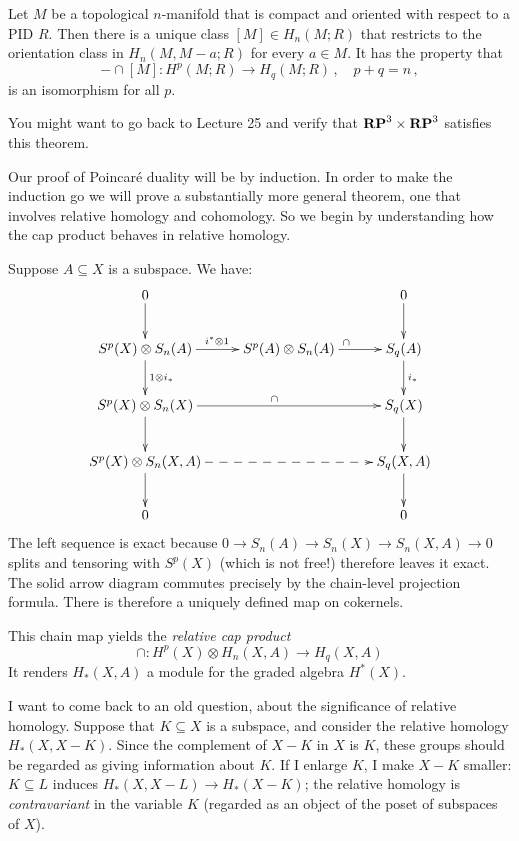 \begin{theorem}
Let $M$ be a topological $n$-manifold that is compact and oriented with 
respect to a PID $R$. Then there is a unique class $[M]\in H_n(M;R)$ that
restricts to the orientation class in $H_n(M,M-a;R)$ for every $a\in M$. 
It has the property that
\[
-\cap[M]:H^p(M;R)\to H_q(M;R)\,,\quad p+q=n\,,
\]
is an isomorphism for all $p$.
\end{theorem}

You might want to go back to Lecture 25 and verify that $\mathbf{RP}^3\times\mathbf{RP}^3$
satisfies this theorem. 

Our proof of Poincar\'e duality will be by induction. In order to make the
induction go we will prove a substantially more general theorem, one that
involves relative homology and cohomology. So we begin by understanding
how the cap product behaves in relative homology.

Suppose $A\subseteq X$ is a subspace. We have:
\begin{equation*}
\xymatrix{
	0\ar[d] & & 0\ar[d]\\
	S^p(X)\otimes S_n(A)\ar[d]^{1\otimes i_\ast}\ar[r]^{i^\ast\otimes 1} & S^p(A)\otimes S_n(A)\ar[r]^{\cap} & S_q(A)\ar[d]^{i_*}\\
	S^p(X)\otimes S_n(X)\ar[rr]^\cap\ar[d] & & S_q(X)\ar[d]\\
	S^p(X)\otimes S_n(X,A)\ar[d]\ar@{-->}[rr] & & S_q(X,A)\ar[d]\\
	0 & & 0
}
\end{equation*}
The left sequence is exact because $0\to S_n(A)\to S_n(X)\to S_n(X,A)\to 0$ splits and tensoring with $S^p(X)$ (which is not free!) therefore leaves it exact. The solid arrow diagram commutes precisely by the chain-level projection formula. There is therefore a uniquely defined map on cokernels.

This chain map yields the {\em relative cap product}
\[
\cap: H^p(X)\otimes H_n(X,A)\to H_q(X,A)
\]
It renders $ H_\ast(X,A)$ a module for the graded algebra $ H^\ast(X)$.


I want to come back to an old question, about the significance of 
relative homology. Suppose that $K\subseteq X$ is a subspace, and consider the
relative homology $H_*(X,X-K)$. Since the complement of $X-K$ in $X$ is $K$,
these groups should be regarded as giving information about $K$. If I enlarge
$K$, I make $X-K$ smaller: $K\subseteq L$ induces
$H_*(X,X-L)\to H_*(X-K)$; the relative homology is {\em contravariant}
in the variable $K$ (regarded as an object of the poset of subspaces of $X$). 

